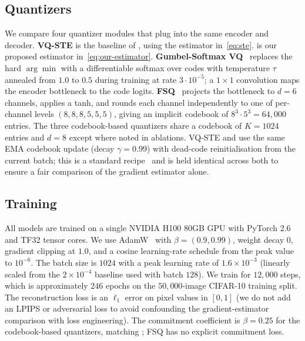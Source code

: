 \subsection{Quantizers}

We compare four quantizer modules that plug into the same encoder
and decoder. \textbf{VQ-STE} is the baseline of
\citet{vandenoord2017vqvae}, using the estimator
in~\eqref{eq:ste}. \textbf{\ours{}} is our proposed estimator
in~\eqref{eq:our-estimator}. \textbf{Gumbel-Softmax
VQ}~\citep{jang2017gumbel} replaces the hard $\arg\min$ with a
differentiable softmax over codes with temperature $\tau$ annealed
from $1.0$ to $0.5$ during training at rate $3{\cdot}10^{-5}$; a
$1{\times}1$ convolution maps the encoder bottleneck to the code
logits. \textbf{FSQ}~\citep{mentzer2024fsq} projects the bottleneck to
$d = 6$ channels, applies a tanh, and rounds each channel
independently to one of per-channel levels $(8,8,8,5,5,5)$, giving an
implicit codebook of $8^3 \cdot 5^3 = 64{,}000$ entries. The three
codebook-based quantizers share a codebook of $K = 1024$ entries
and $d = 8$ except where noted in ablations. VQ-STE and \ours{} use
the same EMA codebook update (decay $\gamma = 0.99$) with
dead-code reinitialisation from the current batch; this is a
standard recipe~\citep{razavi2019vqvae2} and is held identical across
both to ensure a fair comparison of the gradient estimator alone.

\subsection{Training}

All models are trained on a single NVIDIA H100 80GB GPU with PyTorch
2.6 and TF32 tensor cores. We use AdamW~\citep{loshchilov2019adamw}
with $\beta = (0.9, 0.99)$, weight decay $0$, gradient clipping at
$1.0$, and a cosine learning-rate schedule from the peak value to
$10^{-6}$. The batch size is $1024$ with a peak learning rate of
$1.6 \times 10^{-3}$ (linearly scaled from the $2 \times 10^{-4}$
baseline used with batch $128$). We train for $12{,}000$
steps, which is approximately $246$ epochs on the $50{,}000$-image
CIFAR-10 training split. The reconstruction loss is an $\ell_1$
error on pixel values in $[0, 1]$ (we do not add an LPIPS or
adversarial loss to avoid confounding the gradient-estimator
comparison with loss engineering). The commitment coefficient is
$\beta = 0.25$ for the codebook-based quantizers, matching
\citet{vandenoord2017vqvae}; FSQ has no explicit commitment loss.

